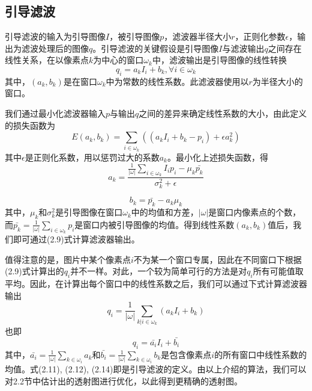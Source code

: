 \documentclass[a4paper, 12pt, oneside]{report}
\begin{document}
{\subsection{引导滤波\quad}
引导滤波的输入为引导图像$I$，被引导图像$p$，滤波器半径大小$r$，正则化参数$\epsilon$，输出为滤波处理后的图像$q$。引导滤波的关键假设是引导图像$I$与滤波输出$q$之间存在线性关系，在以像素点$k$为中心的窗口$\omega_k$中，滤波输出是引导图像的线性转换
\begin{equation}
q_i = a_k I_i + b_k, \forall i \in \omega_k
\end{equation}
其中，$(a_k, b_k)$是在窗口$\omega_k$中为常数的线性系数。此滤波器使用以$r$为半径大小的窗口。

我们通过最小化滤波器输入$p$与输出$q$之间的差异来确定线性系数的大小，由此定义的损失函数为
\begin{equation}
E(a_k, b_k) = \sum_{i\in \omega_k}((a_k I_i + b_k - p_i) + \epsilon a_k^2)
\end{equation}
其中$\epsilon$是正则化系数，用以惩罚过大的系数$a_k$。最小化上述损失函数，得
\begin{equation}
a_k = \frac{\frac{1}{|\omega|}\sum_{i\in \omega_k}I_ip_i - \mu_k\bar{p_k}}{\sigma_k^2 + \epsilon}
\end{equation}

\begin{equation}
b_k = \bar{p_k} - a_k \mu_k
\end{equation}
其中，$\mu_k$和$\sigma_k^2$是引导图像在窗口$\omega_k$中的均值和方差，$|\omega|$是窗口内像素点的个数，而$\bar{p_k} = \frac{1}{|\omega|}\sum_{i\in \omega_k}p_i$是窗口内被引导图像的均值。得到线性系数$(a_k, b_k)$值后，我们即可通过(2.9)式计算滤波器输出。

值得注意的是，图片中某个像素点$i$不为某一个窗口专属，因此在不同窗口下根据(2.9)式计算出的$q_i$并不一样。对此，一个较为简单可行的方法是对$q_i$所有可能值取平均。因此，在计算出每个窗口中的线性系数之后，我们可以通过下式计算滤波器输出
\begin{equation}
q_i = \frac{1}{|\omega|}\sum_{k|i\in \omega_k}(a_k I_i + b_k)
\end{equation}
也即
\begin{equation}
q_i = \bar{a_i}I_i + \bar{b_i}
\end{equation}
其中，$\bar{a_i} = \frac{1}{|\omega|}\sum_{k\in \omega_i}a_k$和$\bar{b_i} = \frac{1}{|\omega|}\sum_{k\in \omega_i}b_k$是包含像素点$i$的所有窗口中线性系数的均值。式(2.11), (2.12), (2.14)即是引导滤波的定义。由以上介绍的算法，我们可以对2.2节中估计出的透射图进行优化，以此得到更精确的透射图。

}
\end{document}
